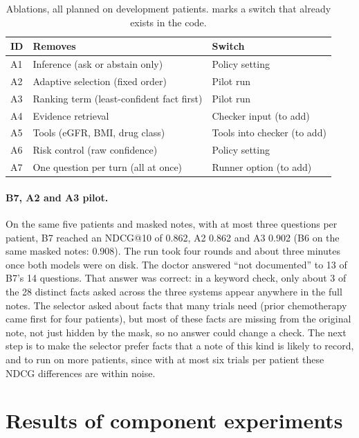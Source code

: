 \documentclass[10pt,a4paper,twocolumn]{article}
\newcommand{\yes}{\ding{51}}
\begin{document}
\begin{table}[H]
\centering\footnotesize
\begin{tabularx}{\columnwidth}{@{}P{0.5cm}LP{2.6cm}@{}}
\toprule
\textbf{ID} & \textbf{Removes} & \textbf{Switch}\\
\midrule
A1 & Inference (ask or abstain only) & Policy setting \yes\\
A2 & Adaptive selection (fixed order) & Pilot run \yes{}\\
A3 & Ranking term (least-confident fact first) & Pilot run \yes{}\\
A4 & Evidence retrieval & Checker input (to add)\\
A5 & Tools (eGFR, BMI, drug class) & Tools into checker (to add)\\
A6 & Risk control (raw confidence) & Policy setting \yes\\
A7 & One question per turn (all at once) & Runner option (to add)\\
\bottomrule
\end{tabularx}
\caption{Ablations, all planned on development patients. \yes{} marks a switch that already exists in the code.}
\label{tab:ablations}
\end{table}

\paragraph{B7, A2 and A3 pilot.} On the same five patients and masked notes, with at most three questions per patient, B7 reached an NDCG@10 of 0.862, A2 0.862 and A3 0.902 (B6 on the same masked notes: 0.908). The run took four rounds and about three minutes once both models were on disk. The doctor answered ``not documented'' to 13 of B7's 14 questions. That answer was correct: in a keyword check, only about 3 of the 28 distinct facts asked across the three systems appear anywhere in the full notes. The selector asked about facts that many trials need (prior chemotherapy came first for four patients), but most of these facts are missing from the original note, not just hidden by the mask, so no answer could change a check. The next step is to make the selector prefer facts that a note of this kind is likely to record, and to run on more patients, since with at most six trials per patient these NDCG differences are within noise.

\section{Results of component experiments}
\end{document}

